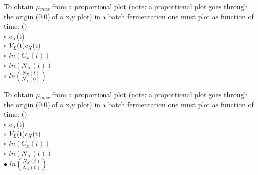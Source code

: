 \documentclass[]{beamer}
\begin{document}
\begin{frame}[shrink] {}
\color{blue}
To obtain $\mu$$_{max}$ from a proportional plot (note: a proportional plot goes through the origin (0,0) of a x,y plot) in a batch fermentation one must plot as function of time: ({\color{red}{Q10}})\\[0.5em]
\color{black}
\setlength{\parindent}{-0.4cm}
{\color{red}$\circ$} $c_{X}$(t)  \\[0.3em]
{\color{red}$\circ$} $V_{L}$(t)$c_{X}$(t)  \\[0.3em]
{\color{red}$\circ$} $ln(C_x(t))$  \\[0.3em]
{\color{red}$\circ$} $ln(N_X(t))$  \\[0.3em]
{\color{red}$\circ$} $ln(\frac{N_X(t)}{N_X(0)})$  \\[0.3em]
\end{frame}
\begin{frame}[shrink] {}
\color{blue}
To obtain $\mu$$_{max}$ from a proportional plot (note: a proportional plot goes through the origin (0,0) of a x,y plot) in a batch fermentation one must plot as function of time: ({\color{green}{Q10}})\\[0.5em]
\color{black}
\setlength{\parindent}{-0.4cm}
{\color{red}$\circ$} $c_{X}$(t)  \\[0.3em]
{\color{red}$\circ$} $V_{L}$(t)$c_{X}$(t)  \\[0.3em]
{\color{red}$\circ$} $ln(C_x(t))$  \\[0.3em]
{\color{red}$\circ$} $ln(N_X(t))$  \\[0.3em]
{\color{red}$\bullet$} $ln(\frac{N_X(t)}{N_X(0)})$  \\[0.3em]
\end{frame}
\end{document}
